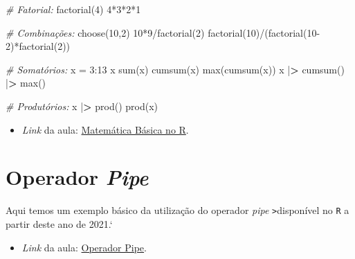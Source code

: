 \documentclass[
  brazilian,
]{book}
\newenvironment{Shaded}{\begin{snugshade}}{\end{snugshade}}
\newcommand{\CommentTok}[1]{\textcolor[rgb]{0.56,0.35,0.01}{\textit{#1}}}
\newcommand{\DecValTok}[1]{\textcolor[rgb]{0.00,0.00,0.81}{#1}}
\newcommand{\ErrorTok}[1]{\textcolor[rgb]{0.64,0.00,0.00}{\textbf{#1}}}
\newcommand{\FunctionTok}[1]{\textcolor[rgb]{0.00,0.00,0.00}{#1}}
\newcommand{\NormalTok}[1]{#1}
\newcommand{\OtherTok}[1]{\textcolor[rgb]{0.56,0.35,0.01}{#1}}
\newcommand{\SpecialCharTok}[1]{\textcolor[rgb]{0.00,0.00,0.00}{#1}}
\providecommand{\tightlist}{%
  \setlength{\itemsep}{0pt}\setlength{\parskip}{0pt}}
\begin{document}
\begin{Shaded}
\begin{Highlighting}[]
\CommentTok{\# Fatorial:}
\FunctionTok{factorial}\NormalTok{(}\DecValTok{4}\NormalTok{)}
\DecValTok{4}\SpecialCharTok{*}\DecValTok{3}\SpecialCharTok{*}\DecValTok{2}\SpecialCharTok{*}\DecValTok{1}

\CommentTok{\# Combinações:}
\FunctionTok{choose}\NormalTok{(}\DecValTok{10}\NormalTok{,}\DecValTok{2}\NormalTok{)}
\DecValTok{10}\SpecialCharTok{*}\DecValTok{9}\SpecialCharTok{/}\FunctionTok{factorial}\NormalTok{(}\DecValTok{2}\NormalTok{)}
\FunctionTok{factorial}\NormalTok{(}\DecValTok{10}\NormalTok{)}\SpecialCharTok{/}\NormalTok{(}\FunctionTok{factorial}\NormalTok{(}\DecValTok{10{-}2}\NormalTok{)}\SpecialCharTok{*}\FunctionTok{factorial}\NormalTok{(}\DecValTok{2}\NormalTok{))}

\CommentTok{\# Somatórios:}
\NormalTok{x }\OtherTok{=} \DecValTok{3}\SpecialCharTok{:}\DecValTok{13}
\NormalTok{x}
\FunctionTok{sum}\NormalTok{(x)}
\FunctionTok{cumsum}\NormalTok{(x)}
\FunctionTok{max}\NormalTok{(}\FunctionTok{cumsum}\NormalTok{(x))}
\NormalTok{x }\SpecialCharTok{|}\ErrorTok{\textgreater{}} \FunctionTok{cumsum}\NormalTok{() }\SpecialCharTok{|}\ErrorTok{\textgreater{}} \FunctionTok{max}\NormalTok{()}

\CommentTok{\# Produtórios:}
\NormalTok{x }\SpecialCharTok{|}\ErrorTok{\textgreater{}} \FunctionTok{prod}\NormalTok{()}
\FunctionTok{prod}\NormalTok{(x)}
\end{Highlighting}
\end{Shaded}

\begin{itemize}
\tightlist
\item
  \emph{Link} da aula: \href{https://youtu.be/QDLqS3y5u7Q}{Matemática Básica no R}.
\end{itemize}

\hypertarget{operador-pipe}{%
\section{\texorpdfstring{Operador \emph{Pipe}}{Operador Pipe}}\label{operador-pipe}}

Aqui temos um exemplo básico da utilização do operador \emph{pipe} \texttt{\textbar{}\textgreater{}}disponível no \texttt{R} a partir deste ano de 2021.`

\begin{itemize}
\tightlist
\item
  \emph{Link} da aula: \href{https://youtu.be/n27-lBxdfFg}{Operador Pipe}.
\end{itemize}
\end{document}
